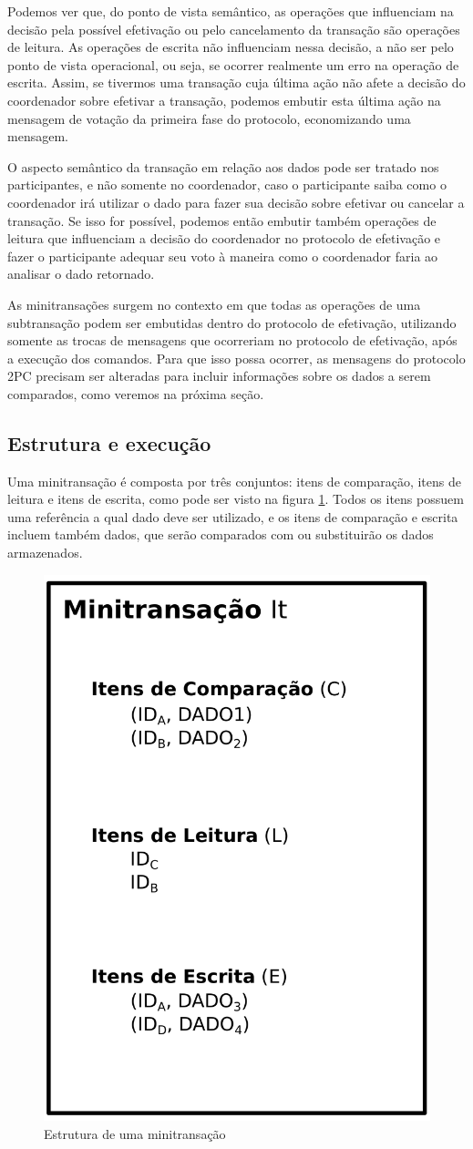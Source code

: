 \documentclass[11pt,twoside,a4paper]{book}
\begin{document}
Podemos ver que, do ponto de vista semântico, as operações que influenciam na decisão pela possível efetivação ou pelo cancelamento da transação são operações de leitura. As operações de escrita não influenciam nessa decisão, a não ser pelo ponto de vista operacional, ou seja, se ocorrer realmente um erro na operação de escrita. Assim, se tivermos uma transação cuja última ação não afete a decisão do coordenador sobre efetivar a transação, podemos embutir esta última ação na mensagem de votação da primeira fase do protocolo, economizando uma mensagem.

O aspecto semântico da transação em relação aos dados pode ser tratado nos participantes, e não somente no coordenador, caso o participante saiba como o coordenador irá utilizar o dado para fazer sua decisão sobre efetivar ou cancelar a transação. Se isso for possível, podemos então embutir também operações de leitura que influenciam a decisão do coordenador no protocolo de efetivação e fazer o participante adequar seu voto à maneira como o coordenador faria ao analisar o dado retornado.

As minitransações surgem no contexto em que todas as operações de uma subtransação podem ser embutidas dentro do protocolo de efetivação, utilizando somente as trocas de mensagens que ocorreriam no protocolo de efetivação, após a execução dos comandos. Para que isso possa ocorrer, as mensagens do protocolo 2PC precisam ser alteradas para incluir informações sobre os dados a serem comparados, como veremos na próxima seção.

\subsection{Estrutura e execução}
\label{subsec:estrutura-minitransacoes}
Uma minitransação é composta por três conjuntos: itens de comparação, itens de leitura e itens de escrita, como pode ser visto na figura \ref{fig:estrutura_minitransacao}. Todos os itens possuem uma referência a qual dado deve ser utilizado, e os itens de comparação e escrita incluem também dados, que serão comparados com ou substituirão os dados armazenados. 

\begin{figure}
  \centering
  \includegraphics[width=.40\textwidth]{estrutura_minitransacao} 
  \caption{Estrutura de uma minitransação}
  \label{fig:estrutura_minitransacao} 
\end{figure}
\end{document}
